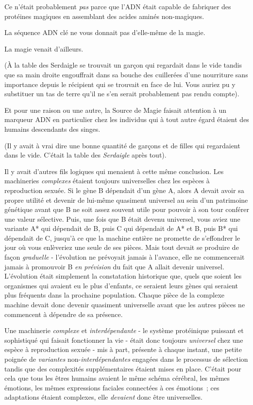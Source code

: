 Ce n'était probablement \emph{pas} parce que l'ADN était capable de fabriquer des protéines magiques en assemblant des acides aminés non-magiques.

La séquence ADN clé ne vous donnait pas d'elle-même de la magie.

La magie venait d'ailleurs.

(À la table des Serdaigle se trouvait un garçon qui regardait dans le vide tandis que sa main droite engouffrait dans sa bouche des cuillerées d'une nourriture sans importance depuis le récipient qui se trouvait en face de lui. Vous auriez pu y substituer un tas de terre qu'il ne s'en serait probablement pas rendu compte).

Et pour une raison ou une autre, la Source de Magie faisait attention à un marqueur ADN en particulier chez les individus qui à tout autre égard étaient des humains descendants des singes.

(Il y avait à vrai dire une bonne quantité de garçons et de filles qui regardaient dans le vide. C'était la table des \emph{Serdaigle} après tout).

Il y avait d'autres fils logiques qui menaient à cette même conclusion. Les machineries \emph{complexes} étaient toujours universelles chez les espèces à reproduction sexuée. Si le gène B dépendait d'un gène A, alors A devait avoir sa propre utilité et devenir de lui-même quasiment universel au sein d'un patrimoine génétique avant que B ne soit assez souvent utile pour pouvoir à son tour conférer une valeur sélective. Puis, une fois que B était devenu universel, vous aviez une variante A* qui dépendait de B, puis C qui dépendait de A* et B, puis B* qui dépendait de C, jusqu'à ce que la machine entière ne promette de s'effondrer le jour où vous enlèveriez une seule de ses pièces. Mais tout devait se produire de façon \emph{graduelle} - l'évolution ne prévoyait jamais à l'avance, elle ne commencerait jamais à promouvoir B \emph{en prévision} du fait que A allait devenir universel. L'évolution était simplement la constatation historique que, quels que soient les organismes qui avaient eu le plus d'enfants, ce seraient leurs gènes qui seraient plus fréquents dans la prochaine population. Chaque pièce de la complexe machine devait donc devenir quasiment universelle avant que les autres pièces ne commencent à dépendre de sa présence.

Une machinerie \emph{complexe} et \emph{interdépendante} - le système protéinique puissant et sophistiqué qui faisait fonctionner la vie - était donc toujours \emph{universel} chez une espèce à reproduction sexuée - mis à part, présente à chaque instant, une petite poignée de \emph{variantes} non-\emph{interdépendantes} engagées dans le processus de sélection tandis que des complexités supplémentaires étaient mises en place. C'était pour cela que tous les êtres humains avaient le même schéma cérébral, les mêmes émotions, les mêmes expressions faciales connectées à ces émotions~; ces adaptations étaient complexes, elle \emph{devaient} donc être universelles.

